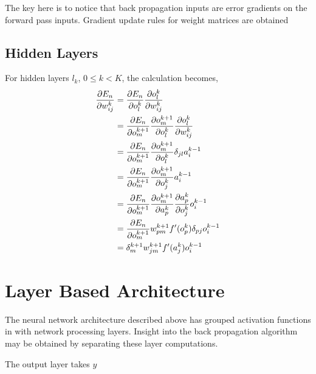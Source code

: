 \documentclass[12pt,notitlepage]{article}
\begin{document}
The key here is to notice that back propagation inputs are error
gradients on the forward pass inputs.  Gradient update rules for
weight matrices are obtained 
\subsection{Hidden Layers}
\label{sec:hidden-layers}

For hidden layers $l_{k}$, $0 \le k < K$, the calculation becomes,
\begin{equation}
  \label{eq:error-grad-hidden}
  \begin{split}
    \frac{\partial E_{n}}{\partial w^{k}_{ij}} &=
    \frac{\partial E_{n}}{\partial o_{l}^{k}}\frac{\partial o_{l}^{k}}{\partial w_{ij}^{k}}\\
    &=
    \frac{\partial E_{n}}{\partial o_{m}^{k+1}}\frac{\partial o_{m}^{k+1}}{\partial o_{l}^{k}}\frac{\partial o_{l}^{k}}{\partial w_{ij}^{k}}\\
    &=
    \frac{\partial E_{n}}{\partial o_{m}^{k+1}}\frac{\partial o_{m}^{k+1}}{\partial o_{l}^{k}}\delta_{jl}a_{i}^{k-1}\\
    &=
    \frac{\partial E_{n}}{\partial o_{m}^{k+1}}\frac{\partial o_{m}^{k+1}}{\partial o_{j}^{k}}a_{i}^{k-1}\\
    &=
    \frac{\partial E_{n}}{\partial o_{m}^{k+1}}\frac{\partial o_{m}^{k+1}}{\partial a_{p}^{k}}\frac{\partial a_{p}^{k}}{\partial o_{j}^{k}}o_{i}^{k-1}\\ 
    &=
    \frac{\partial E_{n}}{\partial o_{m}^{k+1}}w_{pm}^{k+1}f'(o_{p}^{k})\delta_{pj}o_{i}^{k-1}\\ 
    &= \delta^{k+1}_{m}w_{jm}^{k+1}f'(a_{j}^{k})o_{i}^{k-1}\\
  \end{split}
\end{equation}

\section{Layer Based Architecture}
\label{sec:layer-arch}
The neural network architecture described above has grouped activation
functions in with network processing layers.  Insight into the back
propagation algorithm may be obtained by separating these layer
computations.

The output layer takes $y$
\end{document}
